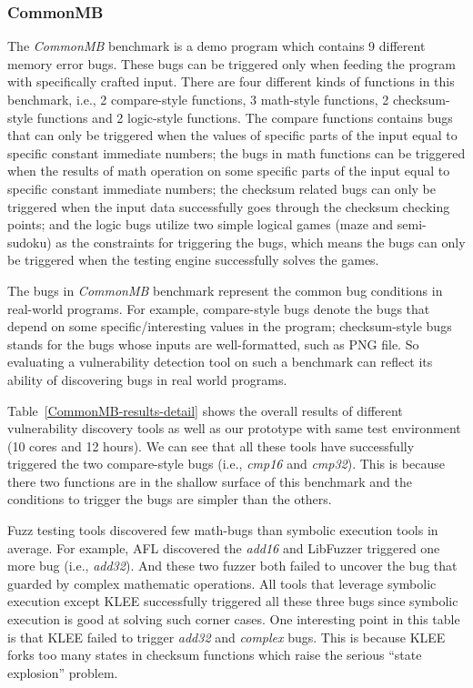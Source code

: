 \subsubsection{CommonMB}
\noindent The \emph{CommonMB} benchmark is a demo program which contains 9 different memory error bugs. These bugs can be triggered only when feeding the program with specifically crafted input. There are four different kinds of functions in this benchmark, i.e., 2 compare-style functions, 3 math-style functions, 2 checksum-style functions and 2 logic-style functions. The compare functions contains bugs that can only be triggered when the values of specific parts of the input equal to specific constant immediate numbers; the bugs in math functions can be triggered when the results of math operation on some specific parts of the input equal to specific constant immediate numbers; the checksum related bugs can only be triggered when the input data successfully goes through the checksum checking points; and the logic bugs utilize two simple logical games (maze and semi-sudoku) as the constraints for triggering the bugs, which means the bugs can only be triggered when the testing engine successfully solves the games.

The bugs in \emph{CommonMB} benchmark represent the common bug conditions in real-world programs. For example, compare-style bugs denote the bugs that depend on some specific/interesting values in the program; checksum-style bugs stands for the bugs whose inputs are well-formatted, such as PNG file.
So evaluating a vulnerability detection tool on such a benchmark can reflect its ability of discovering bugs in real world programs.

Table~\ref{CommonMB-results-detail} shows the overall results of different vulnerability discovery tools as well as our prototype with same test environment (10 cores and 12 hours).
We can see that all these tools have successfully triggered the two compare-style bugs (i.e., \textit{cmp16} and \textit{cmp32}). This is because there two functions are in the shallow surface of this benchmark and the conditions to trigger the bugs are simpler than the others.  

Fuzz testing tools discovered few math-bugs than symbolic execution tools in average.
 For example, AFL discovered the \textit{add16} and LibFuzzer triggered one more bug (i.e., \textit{add32}). 
 And these two fuzzer both failed to uncover the bug that guarded by complex mathematic operations. 
 All tools that leverage symbolic execution except KLEE successfully triggered all these three bugs since symbolic execution is good at solving such corner cases. 
 One interesting point in this table is that KLEE failed to trigger \textit{add32} and \textit{complex} bugs. 
 This is because KLEE forks too many states in checksum functions which raise the serious ``state explosion'' problem. 

